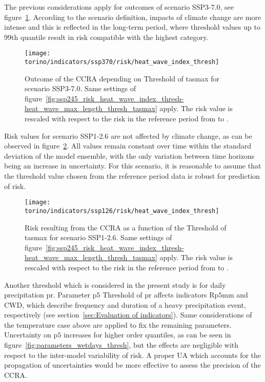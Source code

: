 The previous considerations apply for outcomes of scenario SSP3-7.0, see figure~\ref{fig:ssp370_risk_heat_wave_index_thresh-heat_wave_max_length_thresh_tasmax}. According to the scenario definition, impacts of climate change are more intense and this is reflected in the long-term period, where threshold values up to 99th quantile result in risk compatible with the highest category.

\begin{figure}
  \centering
  \texttt{[image: torino/indicators/ssp370/risk/heat\_wave\_index\_thresh]}
  \caption{Outcome of the \gls{CCRA} depending on {Threshold of \gls{tasmax}} for scenario SSP3-7.0. Same settings of figure~\ref{fig:ssp245_risk_heat_wave_index_thresh-heat_wave_max_length_thresh_tasmax} apply. The risk value is rescaled with respect to the risk in the reference period from  to .}
  \label{fig:ssp370_risk_heat_wave_index_thresh-heat_wave_max_length_thresh_tasmax}
\end{figure}

Risk values for scenario SSP1-2.6 are not affected by climate change, as can be observed in figure~\ref{fig:ssp126_risk_heat_wave_index_thresh-heat_wave_max_length_thresh_tasmax}. All values remain constant over time within the standard deviation of the model ensemble, with the only variation between time horizons being an increase in uncertainty. For this scenario, it is reasonable to assume that the threshold value chosen from the reference period data is robust for prediction of risk.

\begin{figure}
  \centering
  \texttt{[image: torino/indicators/ssp126/risk/heat\_wave\_index\_thresh]}
  \caption{Risk resulting from the \gls{CCRA} as a function of the {Threshold of \gls{tasmax}} for scenario SSP1-2.6. Same settings of figure~\ref{fig:ssp245_risk_heat_wave_index_thresh-heat_wave_max_length_thresh_tasmax} apply. The risk value is rescaled with respect to the risk in the reference period from  to .}
  \label{fig:ssp126_risk_heat_wave_index_thresh-heat_wave_max_length_thresh_tasmax}
\end{figure}

Another threshold which is considered in the present study is for daily precipitation \gls{pr}. Parameter $\mathrm{p5}$ {Threshold of \gls{pr}} affects \glspl{indicator} $\mathrm{Rp5mm}$ and $\mathrm{CWD}$, which describe frequency and duration of a heavy precipitation event, respectively (see section~\ref{sec:Evaluation of indicators}). Same considerations of the temperature case above are applied to fix the remaining parameters.
Uncertainty on $\mathrm{p5}$ increases for higher order quantiles, as can be seen in figure~\ref{fig:parameters_wetdays_thresh}, but the effects are negligible with respect to the inter-model variability of risk. A proper \gls{UA} which accounts for the propagation of uncertainties would be more effective to assess the precision of the \gls{CCRA}.

